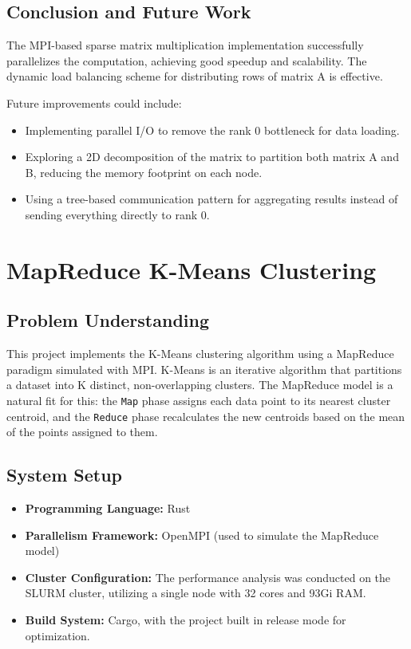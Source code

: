 \documentclass{article}
\begin{document}
\subsection{Conclusion and Future Work}
The MPI-based sparse matrix multiplication implementation successfully parallelizes the computation, achieving good speedup and scalability. The dynamic load balancing scheme for distributing rows of matrix A is effective.

Future improvements could include:
\begin{itemize}
    \item Implementing parallel I/O to remove the rank 0 bottleneck for data loading.
    \item Exploring a 2D decomposition of the matrix to partition both matrix A and B, reducing the memory footprint on each node.
    \item Using a tree-based communication pattern for aggregating results instead of sending everything directly to rank 0.
\end{itemize}

\section{MapReduce K-Means Clustering}

\subsection{Problem Understanding}
This project implements the K-Means clustering algorithm using a MapReduce paradigm simulated with MPI. K-Means is an iterative algorithm that partitions a dataset into K distinct, non-overlapping clusters. The MapReduce model is a natural fit for this: the \texttt{Map} phase assigns each data point to its nearest cluster centroid, and the \texttt{Reduce} phase recalculates the new centroids based on the mean of the points assigned to them.

\subsection{System Setup}
\begin{itemize}
    \item \textbf{Programming Language:} Rust
    \item \textbf{Parallelism Framework:} OpenMPI (used to simulate the MapReduce model)
    \item \textbf{Cluster Configuration:} The performance analysis was conducted on the SLURM cluster, utilizing a single node with 32 cores and 93Gi RAM.
    \item \textbf{Build System:} Cargo, with the project built in release mode for optimization.
\end{itemize}
\end{document}

